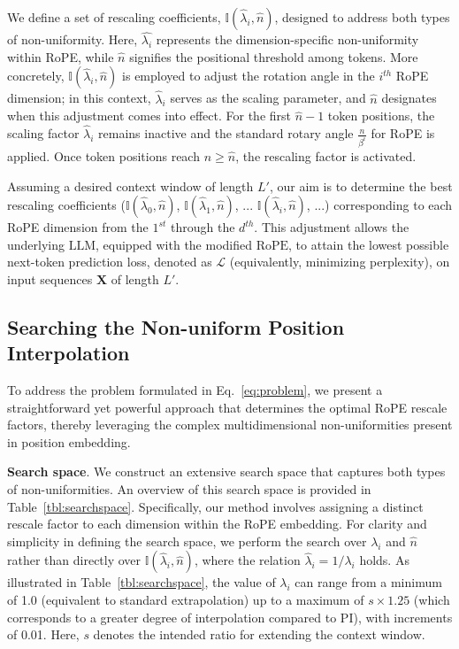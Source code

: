 We define a set of rescaling coefficients, $\mathbb{I}(\hat{\lambda}_{i},\hat{n})$, designed to address both types of non-uniformity. Here, $\hat{\lambda_i}$ represents the dimension-specific non-uniformity within RoPE, while $\hat{n}$ signifies the positional threshold among tokens. More concretely, $\mathbb{I}(\hat{\lambda}_{i},\hat{n})$ is employed to adjust the rotation angle in the $i^{th}$ RoPE dimension; in this context, $\hat\lambda_{i}$ serves as the scaling parameter, and $\hat{n}$ designates when this adjustment comes into effect. For the first $\hat{n}-1$ token positions, the scaling factor $\hat\lambda_{i}$ remains inactive and the standard rotary angle $\frac{n}{\beta^i}$ for RoPE is applied. Once token positions reach $n \ge \hat{n}$, the rescaling factor is activated.

Assuming a desired context window of length $L'$, our aim is to determine the best rescaling coefficients ($\mathbb{I}(\hat{\lambda}_{0},\hat{n})$, $\mathbb{I}(\hat{\lambda}_{1},\hat{n})$, ... $\mathbb{I}(\hat{\lambda}_{i},\hat{n})$, ...) corresponding to each RoPE dimension from the $1^{st}$ through the $d^{th}$. This adjustment allows the underlying $\text{LLM}$, equipped with the modified $\text{RoPE}$, to attain the lowest possible next-token prediction loss, denoted as $\mathcal{L}$ (equivalently, minimizing perplexity), on input sequences $\mathbf{X}$ of length $L'$.

\subsection{Searching the Non-uniform Position Interpolation}

To address the problem formulated in Eq.~\ref{eq:problem}, we present a straightforward yet powerful approach that determines the optimal RoPE rescale factors, thereby leveraging the complex multidimensional non-uniformities present in position embedding.

\textbf{Search space}. We construct an extensive search space that captures both types of non-uniformities. An overview of this search space is provided in Table~\ref{tbl:searchspace}. Specifically, our method involves assigning a distinct rescale factor to each dimension within the RoPE embedding. For clarity and simplicity in defining the search space, we perform the search over $\lambda_i$ and $\hat{n}$ rather than directly over $\mathbb{I}(\hat{\lambda}_{i},\hat{n})$, where the relation $\hat{\lambda}_{i}=1/\lambda_i$ holds. As illustrated in Table~\ref{tbl:searchspace}, the value of $\lambda_i$ can range from a minimum of 1.0 (equivalent to standard extrapolation) up to a maximum of $s\times1.25$ (which corresponds to a greater degree of interpolation compared to PI), with increments of 0.01. Here, $s$ denotes the intended ratio for extending the context window.

